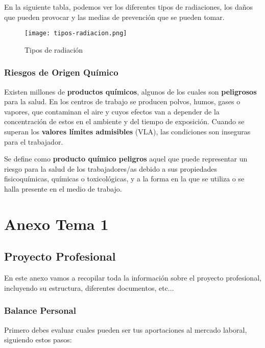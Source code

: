 En la siguiente tabla, podemos ver los diferentes tipos de radiaciones, los daños que pueden provocar y las medias  de prevención que se pueden tomar.

\begin{figure}[H]
    \centering
    \texttt{[image: tipos-radiacion.png]}
    \caption{Tipos de radiación}
\end{figure}

\subsection{Riesgos de Origen Químico}
Existen millones de \textbf{productos químicos}, algunos de los cuales son \textbf{peligrosos} para la salud. En los centros de trabajo se producen polvos, humos, gases o vapores, que contaminan el aire y cuyos efectos van a depender de la concentración de estos en el ambiente y del tiempo de exposición. Cuando se superan los \textbf{valores límites admisibles} (VLA), las condiciones son inseguras para el trabajador.

Se define como \textbf{producto químico peligros} aquel que puede representar un riesgo para la salud de los trabajadores/as debido a sus propiedades fisicoquímicas, químicas o toxicológicas, y a la forma en la que se utiliza o se halla presente en el medio de trabajo.



\chapter{Anexo Tema 1}

\section{Proyecto Profesional}
En este anexo vamos a recopilar toda la información sobre el proyecto profesional, incluyendo su estructura, diferentes documentos, etc...

\subsection{Balance Personal}
Primero debes evaluar cuales pueden ser tus aportaciones al mercado laboral, siguiendo estos pasos:

